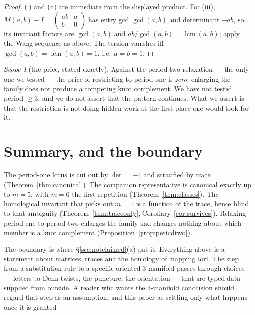 \documentclass[11pt,a4paper]{article}
\theoremstyle{definition}
\theoremstyle{remark}
\newtheorem{scope}[theorem]{Scope}
\newcommand{\lcm}{\operatorname{lcm}}
\begin{document}
\begin{proof}
(i) and (ii) are immediate from the displayed product. For (iii),
$M(a,b)-I=\left(\begin{smallmatrix}ab&a\\b&0\end{smallmatrix}\right)$ has entry gcd
$\gcd(a,b)$ and determinant $-ab$, so its invariant factors are $\gcd(a,b)$ and
$ab/\gcd(a,b)=\lcm(a,b)$; apply the Wang sequence as above. The torsion vanishes iff
$\gcd(a,b)=\lcm(a,b)=1$, i.e.\ $a=b=1$.
\end{proof}

\begin{scope}[the price, stated exactly]\label{sc:pricedperiod}
Against the period-two relaxation --- the only one we tested --- the price of restricting to
period one is \emph{zero}: enlarging the family does not produce a competing knot complement.
We have not tested period $\ge3$, and we do not assert that the pattern continues. What we
assert is that the restriction is not doing hidden work at the first place one would look for
it.
\end{scope}

\section{Summary, and the boundary}\label{sec:summary}

The period-one locus is cut out by $\det=-1$ and stratified by trace
(Theorem~\ref{thm:canonical}). The companion representative is canonical exactly up to $m=5$,
with $m=6$ the first repetition (Theorem~\ref{thm:classes}). The homological invariant that
picks out $m=1$ is a function of the trace, hence blind to that ambiguity
(Theorem~\ref{thm:traceonly}, Corollary~\ref{cor:survives}). Relaxing period one to period two
enlarges the family and changes nothing about which member is a knot complement
(Proposition~\ref{prop:periodtwo}).

The boundary is where \S\ref{sec:notclaimed}(a) put it. Everything above is a statement about
matrices, traces and the homology of mapping tori. The step from a substitution rule to a
specific oriented $3$-manifold passes through choices --- letters to Dehn twists, the puncture,
the orientation --- that are typed data supplied from outside. A reader who wants the
$3$-manifold conclusion should regard that step as an assumption, and this paper as settling
only what happens once it is granted.

\appendix
\end{document}
